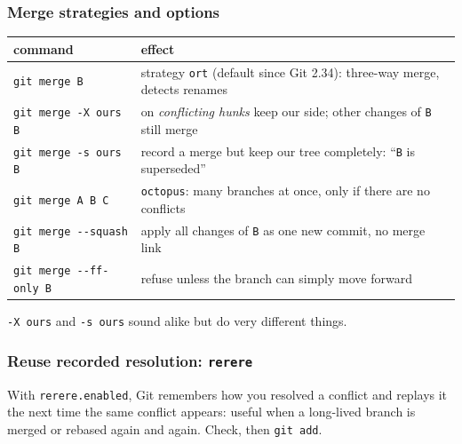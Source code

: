 \documentclass[aspectratio=169,10pt,compress]{beamer}
\begin{document}
\begin{frame}[t,fragile] \frametitle{Merge strategies and options}
  \begin{center}\small
  \begin{tabular}{lL{0.62\textwidth}}
    \toprule
    \textbf{command}                   & \textbf{effect} \\
    \midrule
    \texttt{git merge B}               & strategy \texttt{ort} (default since Git 2.34): three-way merge, detects renames \\
    \texttt{git merge -X ours B}       & on \emph{conflicting hunks} keep our side; other changes of \texttt{B} still merge \\
    \texttt{git merge -s ours B}       & record a merge but keep our tree completely: ``\texttt{B} is superseded'' \\
    \texttt{git merge A B C}           & \texttt{octopus}: many branches at once, only if there are no conflicts \\
    \texttt{git merge -{}-squash B}    & apply all changes of \texttt{B} as one new commit, no merge link \\
    \texttt{git merge -{}-ff-only B}   & refuse unless the branch can simply move forward \\
    \bottomrule
  \end{tabular}
  \end{center}
  \small {} \texttt{-X ours} and \texttt{-s ours} sound alike but do very different things.
\end{frame}




\begin{frame}[t,fragile] \frametitle{Reuse recorded resolution: \texttt{rerere}}

  \vspace{0.1em}
  \small
  With \texttt{rerere.enabled}, Git remembers how you resolved a conflict and replays it the next time the same conflict appears:
  useful when a long-lived branch is merged or rebased again and again. Check, then \texttt{git add}.
\end{frame}
\end{document}

